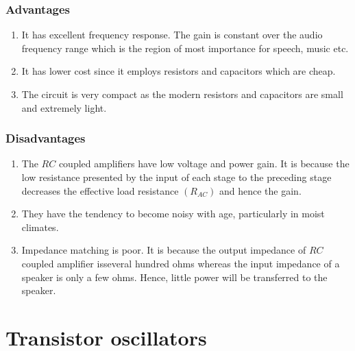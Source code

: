 \subsubsection{Advantages}
\begin{enumerate}
	\item  It has excellent frequency response. The gain is constant over the audio frequency range which is the region of most importance for speech, music etc.
	\item It has lower cost since it employs resistors and capacitors which are cheap.
	\item The circuit is very compact as the modern resistors and capacitors are small and extremely light.
\end{enumerate}

\subsubsection{Disadvantages}
\begin{enumerate}
	\item The $R C$ coupled amplifiers have low voltage and power gain. It is because the low resistance presented by the input of each stage to the preceding stage decreases the effective load resistance $\left(R_{A C}\right)$ and hence the gain.
	\item They have the tendency to become noisy with age, particularly in moist climates.
	\item Impedance matching is poor. It is because the output impedance of $R C$ coupled amplifier isseveral hundred ohms whereas the input impedance of a speaker is only a few ohms. Hence, little power will be transferred to the speaker.
\end{enumerate}

\section{Transistor oscillators}
